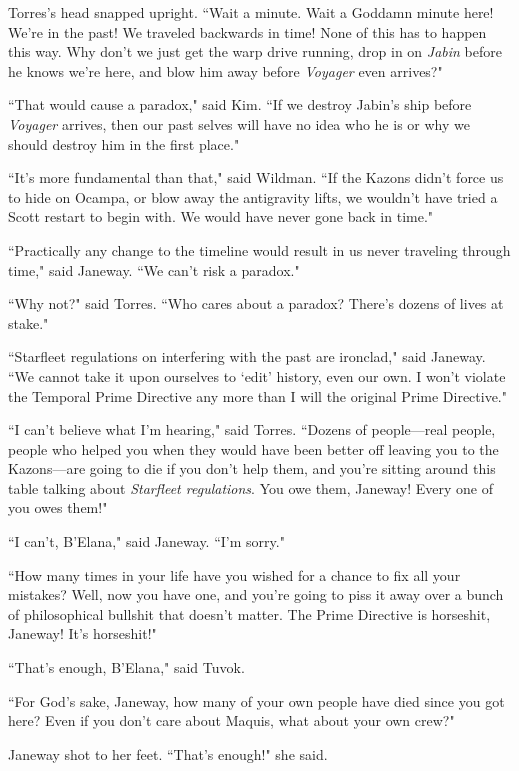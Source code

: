 \documentclass[twoside,letterpaper,12pt]{memoir}
\begin{document}
Torres's head snapped upright. ``Wait a minute. Wait a Goddamn minute here! We're in the past! We traveled backwards in time! None of this has to happen this way. Why don't we just get the warp drive running, drop in on \textit{Jabin} before he knows we're here, and blow him away before \textit{Voyager} even arrives?" 

``That would cause a paradox," said Kim. ``If we destroy Jabin's ship before \textit{Voyager} arrives, then our past selves will have no idea who he is or why we should destroy him in the first place." 

``It's more fundamental than that," said Wildman. ``If the Kazons didn't force us to hide on Ocampa, or blow away the antigravity lifts, we wouldn't have tried a Scott restart to begin with. We would have never gone back in time." 

``Practically any change to the timeline would result in us never traveling through time," said Janeway. ``We can't risk a paradox." 

``Why not?" said Torres. ``Who cares about a paradox? There's dozens of lives at stake." 

``Starfleet regulations on interfering with the past are ironclad," said Janeway. ``We cannot take it upon ourselves to `edit' history, even our own. I won't violate the Temporal Prime Directive any more than I will the original Prime Directive." 

``I can't believe what I'm hearing," said Torres. ``Dozens of people---real people, people who helped you when they would have been better off leaving you to the Kazons---are going to die if you don't help them, and you're sitting around this table talking about \textit{Starfleet regulations}. You owe them, Janeway! Every one of you owes them!" 

``I can't, B'Elana," said Janeway. ``I'm sorry." 

``How many times in your life have you wished for a chance to fix all your mistakes? Well, now you have one, and you're going to piss it away over a bunch of philosophical bullshit that doesn't matter. The Prime Directive is horseshit, Janeway! It’s horseshit!" 

``That's enough, B'Elana," said Tuvok. 

``For God's sake, Janeway, how many of your own people have died since you got here? Even if you don't care about Maquis, what about your own crew?" 

Janeway shot to her feet. ``That's enough!" she said. 
\end{document}
